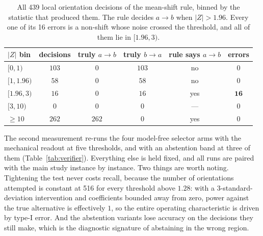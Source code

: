 \documentclass{article}
\begin{document}
\begin{table}[h]
\caption{All 439 local orientation decisions of the mean-shift rule, binned by the statistic
that produced them. The rule decides $a \to b$ when $|Z| > 1.96$. Every one of its 16 errors
is a non-shift whose noise crossed the threshold, and all of them lie in $[1.96, 3)$.}
\label{tab:zbins}
\centering
\small
\begin{tabular}{lccccc}
\toprule
$|Z|$ bin & decisions & truly $a \to b$ & truly $b \to a$ & rule says $a \to b$ & errors \\
\midrule
$[0,1)$ & $103$ & $0$ & $103$ & no & $0$ \\
$[1,1.96)$ & $58$ & $0$ & $58$ & no & $0$ \\
$[1.96,3)$ & $16$ & $0$ & $16$ & yes & $\mathbf{16}$ \\
$[3,10)$ & $0$ & $0$ & $0$ & --- & $0$ \\
$\geq 10$ & $262$ & $262$ & $0$ & yes & $0$ \\
\bottomrule
\end{tabular}
\end{table}

The second measurement re-runs the four model-free selector arms with the mechanical readout
at five thresholds, and with an abstention band at three of them
(Table~\ref{tab:verifier}). Everything else is held fixed, and all runs are paired with the
main study instance by instance. Two things are worth noting. Tightening the test never costs
recall, because the number of orientations attempted is constant at 516 for every threshold
above $1.28$: with a $3$-standard-deviation intervention and coefficients bounded away from
zero, power against the true alternative is effectively $1$, so the entire operating
characteristic is driven by type-I error. And the abstention variants lose accuracy on the
decisions they still make, which is the diagnostic signature of abstaining in the wrong
region.
\end{document}
